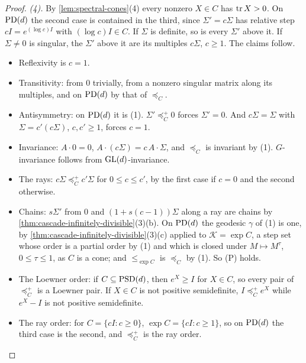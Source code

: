 \begin{proof}
\emph{(4).} By \ref{lem:spectral-cones}(4) every nonzero $X \in C$ has $\operatorname{tr} X > 0$.
On $\mathrm{PD}(d)$ the second case is contained in the third, since $\Sigma' = c\Sigma$ has relative step
$cI = e^{(\log c)I}$ with $(\log c)I \in C$. If $\Sigma$ is definite, so is every $\Sigma'$ above it. If
$\Sigma \ne 0$ is singular, the $\Sigma'$ above it are its multiples $c\Sigma$, $c \ge 1$. The claims follow.
\begin{itemize}
\item Reflexivity is $c = 1$.
\item Transitivity: from $0$ trivially, from a nonzero singular matrix along its multiples, and on
$\mathrm{PD}(d)$ by that of $\preceq_C$.
\item Antisymmetry: on $\mathrm{PD}(d)$ it is (1). $\Sigma' \preceq^+_C 0$ forces $\Sigma' = 0$. And $c\Sigma = \Sigma$
with $\Sigma = c'(c\Sigma)$, $c, c' \ge 1$, forces $c = 1$.
\item Invariance: $A \cdot 0 = 0$, $A \cdot (c\Sigma) = c\,A\cdot\Sigma$, and $\preceq_C$ is invariant by (1).
$G$-invariance follows from $\mathrm{GL}(d)$-invariance.
\item The rays: $c\Sigma \preceq^+_C c'\Sigma$ for $0 \le c \le c'$, by the first case if $c = 0$ and the
second otherwise.
\item Chains: $s\Sigma'$ from $0$ and $(1 + s(c-1))\Sigma$ along a ray are chains by
\ref{thm:cascade-infinitely-divisible}(3)(b). On $\mathrm{PD}(d)$ the geodesic $\gamma$ of (1) is one, by
\ref{thm:cascade-infinitely-divisible}(3)(c) applied to $\mathcal K = \exp C$, a step set whose order is a partial
order by (1) and which is closed under $M \mapsto M^\tau$, $0 \le \tau \le 1$, as $C$ is a cone; and
$\le_{\exp C}$ is $\preceq_C$ by (1). So (P) holds.
\item The Loewner order: if $C \subseteq \mathrm{PSD}(d)$, then $e^X \ge I$ for $X \in C$, so every pair of
$\preceq^+_C$ is a Loewner pair. If $X \in C$ is not positive semidefinite, $I \preceq^+_C e^X$ while
$e^X - I$ is not positive semidefinite.
\item The ray order: for $C = \{cI : c \ge 0\}$, $\exp C = \{cI : c \ge 1\}$, so on $\mathrm{PD}(d)$ the third case
is the second, and $\preceq^+_C$ is the ray order.
\end{itemize}
\end{proof}

